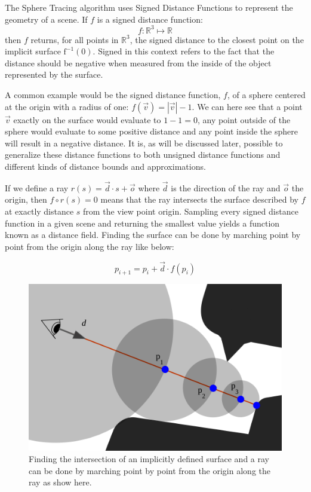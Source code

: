 		The Sphere Tracing algorithm uses Signed Distance Functions to
		represent the geometry of a scene. If $f$ is a signed distance
		function: $$f : \mathbb{R}^{3}\mapsto\mathbb{R}$$ then $f$ returns, for
		all points in $\mathbb{R}^3$, the signed distance to the closest point
		on the implicit surface $\text{f}^{-1}(0)$. Signed in this context
		refers to the fact that the distance should be negative when measured
		from the inside of the object represented by the surface.

		A common example would be the signed distance function, $f$, of a
		sphere centered at the origin with a radius of one: $f(\vec{v}) =
		|\vec{v}| - 1$. We can here see that a point $\vec{v}$ exactly on the
		surface would evaluate to $1-1=0$, any point outside of the sphere
		would evaluate to some positive distance and any point inside the
		sphere will result in a negative distance. It is, as will be discussed
		later, possible to generalize these distance functions to both unsigned
		distance functions and different kinds of distance bounds and
		approximations.

		If we define a ray $r(s) = \vec{d} \cdot s + \vec{o}$ where $\vec{d}$
		is the direction of the ray and $\vec{o}$ the origin, then $f\circ r(s)
		= 0$ means that the ray intersects the surface described by $f$ at
		exactly distance $s$ from the view point origin. Sampling every signed
		distance function in a given scene and returning the smallest value
		yields a function known as a distance field. Finding the surface can be
		done by marching point by point from the origin along the ray like
		below: 
		
		$$p_{i+1} = p_i + \vec{d}\cdot f(p_i)$$ 
		
		\begin{figure}
			\centering
			\includegraphics[width=0.75\linewidth]{figure/SDF2}
			\caption{Finding the intersection of an implicitly defined surface
				and a ray can be done by marching point by point from the 
				origin along the ray as show here.}
		\end{figure}

